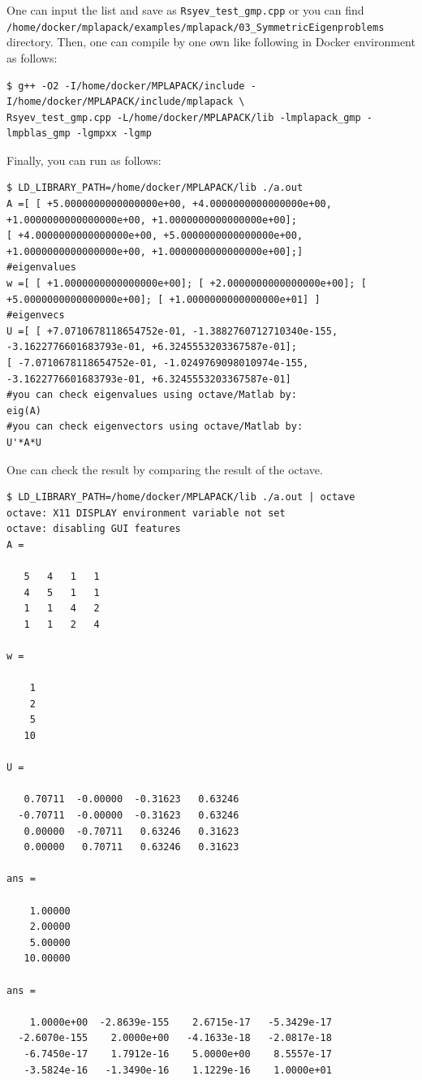 \documentclass[12pt]{article}
\begin{document}
One can input the list and save as {\tt Rsyev\_test\_gmp.cpp} or you can find\\
{\tt /home/docker/mplapack/examples/mplapack/03\_SymmetricEigenproblems} directory. Then, one can compile by one own like following in Docker environment as follows:
\begin{verbatim}
$ g++ -O2 -I/home/docker/MPLAPACK/include -I/home/docker/MPLAPACK/include/mplapack \
Rsyev_test_gmp.cpp -L/home/docker/MPLAPACK/lib -lmplapack_gmp -lmpblas_gmp -lgmpxx -lgmp
\end{verbatim}
Finally, you can run as follows:
{\fontsize{9.5pt}{0.4cm}\selectfont
\begin{verbatim}
$ LD_LIBRARY_PATH=/home/docker/MPLAPACK/lib ./a.out
A =[ [ +5.0000000000000000e+00, +4.0000000000000000e+00, +1.0000000000000000e+00, +1.0000000000000000e+00];
[ +4.0000000000000000e+00, +5.0000000000000000e+00, +1.0000000000000000e+00, +1.0000000000000000e+00];]
#eigenvalues
w =[ [ +1.0000000000000000e+00]; [ +2.0000000000000000e+00]; [ +5.0000000000000000e+00]; [ +1.0000000000000000e+01] ]
#eigenvecs
U =[ [ +7.0710678118654752e-01, -1.3882760712710340e-155, -3.1622776601683793e-01, +6.3245553203367587e-01];
[ -7.0710678118654752e-01, -1.0249769098010974e-155, -3.1622776601683793e-01, +6.3245553203367587e-01]
#you can check eigenvalues using octave/Matlab by:
eig(A)
#you can check eigenvectors using octave/Matlab by:
U'*A*U
\end{verbatim}
}
One can check the result by comparing the result of the octave.
{\footnotesize
\begin{verbatim}
$ LD_LIBRARY_PATH=/home/docker/MPLAPACK/lib ./a.out | octave
octave: X11 DISPLAY environment variable not set
octave: disabling GUI features
A =

   5   4   1   1
   4   5   1   1
   1   1   4   2
   1   1   2   4

w =

    1
    2
    5
   10

U =

   0.70711  -0.00000  -0.31623   0.63246
  -0.70711  -0.00000  -0.31623   0.63246
   0.00000  -0.70711   0.63246   0.31623
   0.00000   0.70711   0.63246   0.31623

ans =

    1.00000
    2.00000
    5.00000
   10.00000

ans =

    1.0000e+00  -2.8639e-155    2.6715e-17   -5.3429e-17
  -2.6070e-155    2.0000e+00   -4.1633e-18   -2.0817e-18
   -6.7450e-17    1.7912e-16    5.0000e+00    8.5557e-17
   -3.5824e-16   -1.3490e-16    1.1229e-16    1.0000e+01

\end{verbatim}
}
\end{document}
